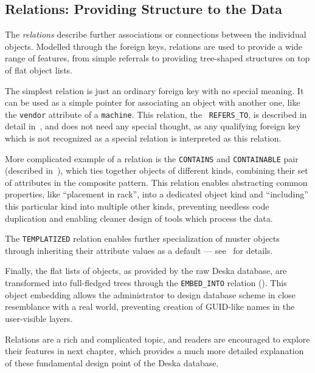 \documentclass[deska]{subfiles}
\begin{document}
\subsection{Relations: Providing Structure to the Data}

The {\em relations} describe further associations or connections between the individual objects.  Modelled through the
foreign keys, relations are used to provide a wide range of features, from simple referrals to providing tree-shaped
structures on top of flat object lists.

The simplest relation is just an ordinary foreign key with no special meaning.  It can be used as a simple pointer for
associating an object with another one, like the {\tt vendor} attribute of a {\tt machine}.  This relation, the {\tt
REFERS\_TO}, is described in detail in~, and does not need any special thought, as any
qualifying foreign key which is not recognized as a special relation is interpreted as this relation.

More complicated example of a relation is the {\tt CONTAINS} and {\tt CONTAINABLE} pair (described
in~), which ties together objects of different kinds, combining their set of attributes in
the composite pattern.  This relation enables abstracting common properties, like ``placement in rack'', into a
dedicated object kind and ``including'' this particular kind into multiple other kinds, preventing needless code
duplication and enabling cleaner design of tools which process the data.

The {\tt TEMPLATIZED} relation enables further specialization of muster objects through inheriting their attribute
values as a default --- see~ for details.

Finally, the flat lists of objects, as provided by the raw Deska database, are transformed into full-fledged trees
through the {\tt EMBED\_INTO} relation ().  This object embedding allows the
administrator to design database scheme in close resemblance with a real world, preventing creation of GUID-like names
in the user-visible layers.

Relations are a rich and complicated topic, and readers are encouraged to explore their features in next chapter,
which provides a much more detailed explanation of these fundamental design point of the Deska database.
\end{document}
